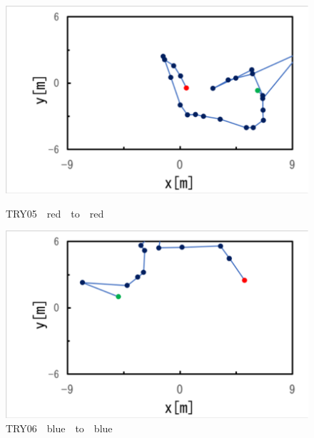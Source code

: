 \begin{figure}[ht]
  \begin{center}
    
    \includegraphics[clip,width=15.0cm]{figure/TRY05_red_to_red.eps}
    \caption{TRY05　red　to　red}
    \label{fig:try05}
    
    \includegraphics[width=15.0cm]{figure/TRY06_blue_to_blue.eps}
    \caption{TRY06　blue　to　blue}
    \label{ig:try06}
    
  \end{center}
\end{figure}

